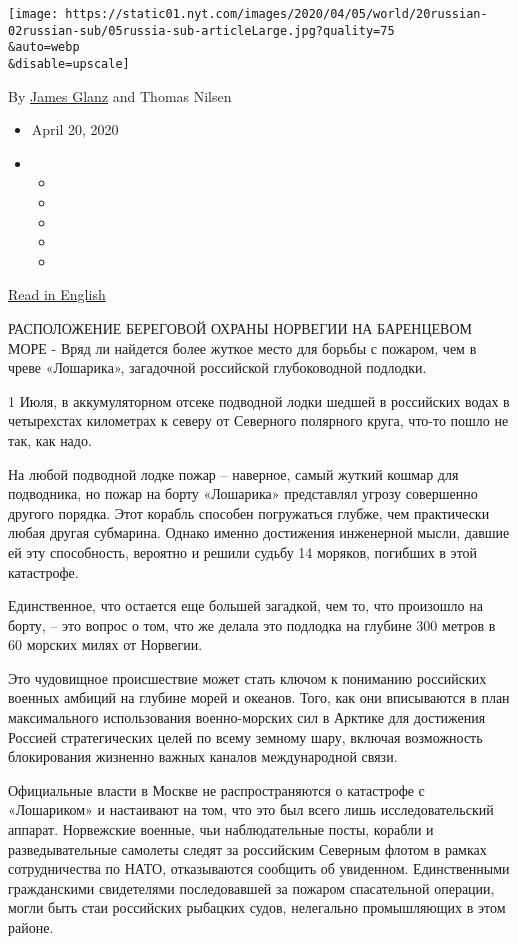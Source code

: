 \texttt{[image: https://static01.nyt.com/images/2020/04/05/world/20russian-02russian-sub/05russia-sub-articleLarge.jpg?quality=75\\\&auto=webp\\\&disable=upscale]}

By \href{https://www.nytimes.com/by/james-glanz}{James Glanz} and Thomas
Nilsen

\begin{itemize}
\item
  April 20, 2020
\item
  \begin{itemize}
  \item
  \item
  \item
  \item
  \item
  \end{itemize}
\end{itemize}

\href{https://www.nytimes.com/2020/04/20/world/europe/russian-submarine-fire-losharik.html}{Read
in English}

РАСПОЛОЖЕНИЕ БЕРЕГОВОЙ ОХРАНЫ НОРВЕГИИ НА БАРЕНЦЕВОМ МОРЕ - Вряд ли
найдется более жуткое место для борьбы с пожаром, чем в чреве
«Лошарика», загадочной российской глубоководной подлодки.

1 Июля, в аккумуляторном отсеке подводной лодки шедшей в российских
водах в четырехстах километрах к северу от Северного полярного круга,
что-то пошло не так, как надо.

На любой подводной лодке пожар -- наверное, самый жуткий кошмар для
подводника, но пожар на борту «Лошарика» представлял угрозу совершенно
другого порядка. Этот корабль способен погружаться глубже, чем
практически любая другая субмарина. Однако именно достижения инженерной
мысли, давшие ей эту способность, вероятно и решили судьбу 14 моряков,
погибших в этой катастрофе.

Единственное, что остается еще большей загадкой, чем то, что произошло
на борту, -- это вопрос о том, что же делала это подлодка на глубине 300
метров в 60 морских милях от Норвегии.

Это чудовищное происшествие может стать ключом к пониманию российских
военных амбиций на глубине морей и океанов. Того, как они вписываются в
план максимального использования военно-морских сил в Арктике для
достижения Россией стратегических целей по всему земному шару, включая
возможность блокирования жизненно важных каналов международной связи.

Официальные власти в Москве не распространяются о катастрофе с
«Лошариком» и настаивают на том, что это был всего лишь
исследовательский аппарат. Норвежские военные, чьи наблюдательные посты,
корабли и разведывательные самолеты следят за российским Северным флотом
в рамках сотрудничества по НАТО, отказываются сообщить об увиденном.
Единственными гражданскими свидетелями последовавшей за пожаром
спасательной операции, могли быть стаи российских рыбацких судов,
нелегально промышляющих в этом районе.

